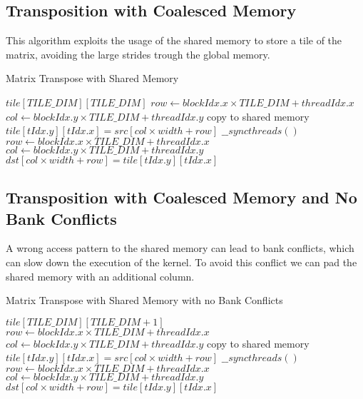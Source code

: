 \documentclass[]{IEEEconf}
\begin{document}
\subsection{Transposition with Coalesced Memory}
This algorithm exploits the usage of the shared memory to store a tile of the matrix, avoiding the large strides trough 
the global memory.
\begin{algorithm}
    \caption{Matrix Transpose with Shared Memory}
    \begin{algorithmic}[1]
            \State $tile [TILE\_DIM][TILE\_DIM]$
            \State $row \gets blockIdx.x \times TILE\_DIM + threadIdx.x$
            \State $col \gets blockIdx.y \times TILE\_DIM + threadIdx.y$
             \Comment copy to shared memory
                \State $tile[tIdx.y][tIdx.x] = src[col \times width + row]$
            \EndIf
            \State $\_\_syncthreads()$
            \State $row \gets blockIdx.x \times TILE\_DIM + threadIdx.x$
            \State $col \gets blockIdx.y \times TILE\_DIM + threadIdx.y$
                \State $dst[col \times width + row] = tile[tIdx.y][tIdx.x]$
            \EndIf
        \EndProcedure
    \end{algorithmic}
\end{algorithm}
\subsection{Transposition with Coalesced Memory and No Bank Conflicts}
A wrong access pattern to the shared memory can lead to bank conflicts, which can slow down the execution
of the kernel. To avoid this conflict we can pad the shared memory with an additional column.
\begin{algorithm}
    \caption{Matrix Transpose with Shared Memory with no Bank Conflicts}
    \begin{algorithmic}[1]
            \State $tile [TILE\_DIM][TILE\_DIM + 1]$
            \State $row \gets blockIdx.x \times TILE\_DIM + threadIdx.x$
            \State $col \gets blockIdx.y \times TILE\_DIM + threadIdx.y$
             \Comment copy to shared memory
                \State $tile[tIdx.y][tIdx.x] = src[col \times width + row]$
            \EndIf
            \State $\_\_syncthreads()$
            \State $row \gets blockIdx.x \times TILE\_DIM + threadIdx.x$
            \State $col \gets blockIdx.y \times TILE\_DIM + threadIdx.y$
                \State $dst[col \times width + row] = tile[tIdx.y][tIdx.x]$
            \EndIf
        \EndProcedure
    \end{algorithmic}
\end{algorithm}
\end{document}
